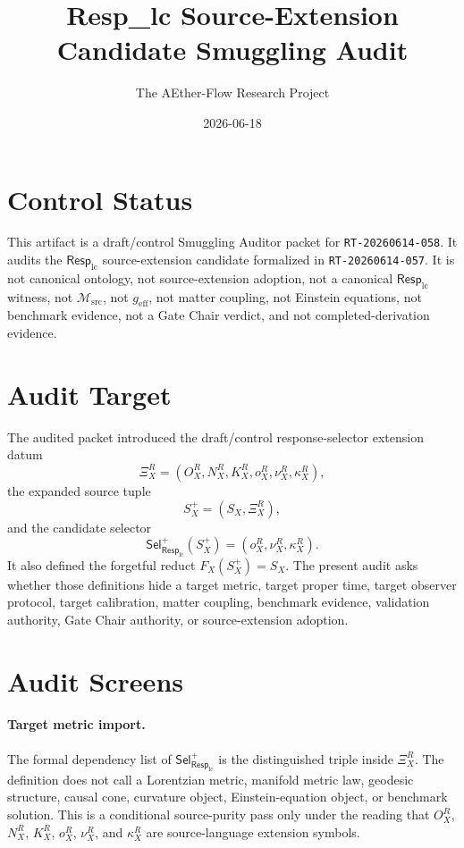 \documentclass[11pt]{article}
\title{Resp\_lc Source-Extension Candidate Smuggling Audit}
\author{The AEther-Flow Research Project}
\date{2026-06-18}
\newcommand{\RespLC}{\mathsf{Resp}_{\mathrm{lc}}}
\newcommand{\SelResp}{\mathsf{Sel}_{\RespLC}}
\newcommand{\Msrc}{\mathcal{M}_{\mathrm{src}}}
\newcommand{\geff}{g_{\mathrm{eff}}}
\newcommand{\XiR}{\Xi_X^R}
\newcommand{\SX}{S_X}
\newcommand{\Splus}{S_X^+}
\begin{document}
\maketitle

\section*{Control Status}

This artifact is a draft/control Smuggling Auditor packet for
\texttt{RT-20260614-058}. It audits the \(\RespLC\) source-extension
candidate formalized in \texttt{RT-20260614-057}. It is not canonical
ontology, not source-extension adoption, not a canonical \(\RespLC\)
witness, not \(\Msrc\), not \(\geff\), not matter coupling, not
Einstein equations, not benchmark evidence, not a Gate Chair verdict,
and not completed-derivation evidence.

\section{Audit Target}

The audited packet introduced the draft/control response-selector
extension datum
\[
  \XiR=(O_X^R,N_X^R,K_X^R,o_X^R,\nu_X^R,\kappa_X^R),
\]
the expanded source tuple
\[
  \Splus=(\SX,\XiR),
\]
and the candidate selector
\[
  \SelResp^{+}(\Splus)=(o_X^R,\nu_X^R,\kappa_X^R).
\]
It also defined the forgetful reduct \(F_X(\Splus)=\SX\). The present
audit asks whether those definitions hide a target metric, target
proper time, target observer protocol, target calibration, matter
coupling, benchmark evidence, validation authority, Gate Chair
authority, or source-extension adoption.

\section{Audit Screens}

\paragraph{Target metric import.}
The formal dependency list of \(\SelResp^{+}\) is the distinguished
triple inside \(\XiR\). The definition does not call a Lorentzian
metric, manifold metric law, geodesic structure, causal cone, curvature
object, Einstein-equation object, or benchmark solution. This is a
conditional source-purity pass only under the reading that \(O_X^R\),
\(N_X^R\), \(K_X^R\), \(o_X^R\), \(\nu_X^R\), and \(\kappa_X^R\) are
source-language extension symbols.
\end{document}
